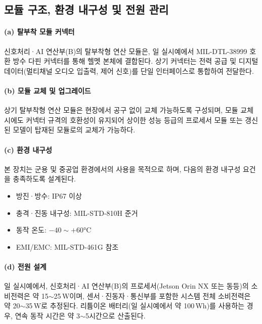 \documentclass{article}
\begin{document}
\subsection{모듈 구조, 환경 내구성 및 전원 관리}

\paragraph{(a) 탈부착 모듈 커넥터}

신호처리·AI 연산부(B)의 탈부착형 연산 모듈은, 일 실시예에서 MIL-DTL-38999 호환 방수 다핀 커넥터를 통해 헬멧 본체에 결합된다. 상기 커넥터는 전력 공급 및 디지털 데이터(멀티채널 오디오 입출력, 제어 신호)를 단일 인터페이스로 통합하여 전달한다.

\paragraph{(b) 모듈 교체 및 업그레이드}

상기 탈부착형 연산 모듈은 현장에서 공구 없이 교체 가능하도록 구성되며, 모듈 교체 시에도 커넥터 규격의 호환성이 유지되어 상이한 성능 등급의 프로세서 모듈 또는 갱신된 모델이 탑재된 모듈로의 교체가 가능하다.

\paragraph{(c) 환경 내구성}

본 장치는 군용 및 중공업 환경에서의 사용을 목적으로 하며, 다음의 환경 내구성 요건을 충족하도록 설계된다.

\begin{itemize}
    \item 방진·방수: IP67 이상
    \item 충격·진동 내구성: MIL-STD-810H 준거
    \item 동작 온도: $-40 \sim +60$°C
    \item EMI/EMC: MIL-STD-461G 참조
\end{itemize}

\paragraph{(d) 전원 설계}

일 실시예에서, 신호처리·AI 연산부(B)의 프로세서(Jetson Orin NX 또는 동등)의 소비전력은 약 15$\sim$25\,W이며, 센서·진동자·통신부를 포함한 시스템 전체 소비전력은 약 20$\sim$35\,W로 추정된다. 리튬이온 배터리(일 실시예에서 약 100\,Wh)를 사용하는 경우, 연속 동작 시간은 약 3$\sim$5시간으로 산출된다.
\end{document}
